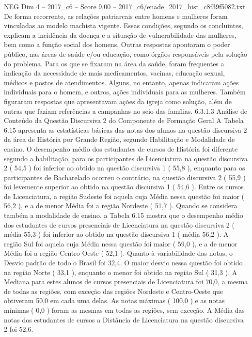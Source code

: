 \begin{textsample}{NEG Dim 4 – 2017\_c6 – Score 9.00 – 2017\_c6/enade\_2017\_hist\_c8f39f5082.txt}
De forma recorrente, as relações patriarcais entre homens e mulheres foram vinculadas ao modelo machista vigente.
Essas condições, segundo os concluintes, explicam a incidência da doença e a situação de vulnerabilidade das mulheres, bem como a função social dos homens.
Outras respostas apontaram o poder público, nas áreas de saúde e/ou educação, como órgãos responsáveis pela solução do problema.
Para os que se fixaram na área da saúde, foram frequentes a indicação da necessidade de mais medicamentos, vacinas, educação sexual, médicos e postos de atendimentos.
Alguns, no entanto, apenas indicaram ações individuais para o homem, e outros, ações individuais para as mulheres.
Também figuraram respostas que apresentavam ações da igreja como solução, além de outras que faziam referências a campanhas no seio das famílias. 6.3.1.3 Análise de Conteúdo da Questão Discursiva 2 do Componente de Formação Geral A Tabela 6.15 apresenta as estatísticas básicas das notas dos alunos na questão discursiva 2 da área de História por Grande Região, segundo Habilitação e Modalidade de ensino.
O desempenho médio dos estudantes de cursos de História foi diferente segundo a habilitação, para os participantes de Licenciatura na questão discursiva 2 ( 54,5 ) foi inferior ao obtido na questão discursiva 1 ( 55,8 ), enquanto para os participantes de Bacharelado ocorreu o contrário, na questão discursiva 2 ( 55,9 ) foi levemente superior ao obtido na questão discursiva 1 ( 54,6 ).
Entre os cursos de Licenciatura, a região Sudeste foi aquela cuja Média nessa questão foi maior ( 56,2 ), e a de menor Média foi a região Nordeste ( 51,7 ).
Quando se considera também a modalidade de ensino, a Tabela 6.15 mostra que o desempenho médio dos estudantes de cursos presenciais de Licenciatura na questão discursiva 2 ( média 55,3 ) foi inferior ao obtido na questão discursiva 1 ( média 56,2 ).
A região Sul foi aquela cuja Média nessa questão foi maior ( 59,0 ), e a de menor Média foi a região Centro-Oeste ( 52,1 ).
Quanto à variabilidade das notas, o Desvio padrão de todo o Brasil foi 32,4.
O maior desvio nessa questão foi obtido na região Norte ( 33,1 ), enquanto o menor foi obtido na região Sul ( 31,3 ).
A Mediana para estes alunos de cursos presenciais de Licenciatura foi 70,0, a mesma de todas as regiões, com exceção das regiões Nordeste e Centro-Oeste que obtiveram 50,0 em cada uma delas.
As notas máximas ( 100,0 ) e as notas mínimas ( 0,0 ) foram as mesmas em todas as regiões, sem exceção.
A Média das notas dos estudantes de cursos a Distância de Licenciatura na questão discursiva 2 foi 52,6.

\end{textsample}
